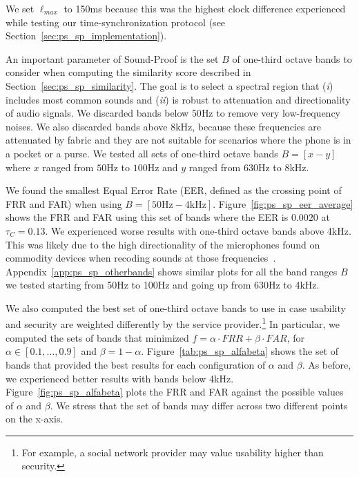 We set $\ell_{max}$ to 150ms because this was the highest clock difference experienced while testing our time-synchronization protocol (see Section~\ref{sec:ps_sp_implementation}).


An important parameter of Sound-Proof is the set $B$ of one-third octave bands to consider when computing the similarity score described in Section~\ref{sec:ps_sp_similarity}.
The goal is to select a spectral region that (\emph{i}) includes most common sounds and (\emph{ii}) is robust to attenuation and directionality of audio signals.
We discarded bands below $50\text{Hz}$ to remove very low-frequency noises.
We also discarded bands above $8\text{kHz}$, because these frequencies are attenuated by fabric and they are not suitable for scenarios where the phone is in a pocket or a purse.
We tested all sets of one-third octave bands $B=[x-y]$ where $x$ ranged from $50$Hz to $100$Hz and $y$ ranged from $630$Hz to $8$kHz.


We found the smallest Equal Error Rate (EER, defined as the crossing point of FRR and FAR) when using $B=[50\text{Hz}-4\text{kHz}]$.
Figure~\ref{fig:ps_sp_eer_average} shows the FRR and FAR using this set of bands where the EER is $0.0020$ at $\tau_{C}=0.13$.
We experienced worse results with one-third octave bands above 4kHz.
This was likely due to the high directionality of the microphones found on commodity devices when recoding sounds at those frequencies~\cite{book}. Appendix~\ref{app:ps_sp_otherbands} shows similar plots for all the band ranges $B$ we tested starting from 50Hz to 100Hz and going up from 630Hz to 4kHz.

We also computed the best set of one-third octave bands to use in case usability and security are weighted differently by the service provider.\footnote{For example,
a social network provider may value usability higher than security.}
In particular, we computed the sets of bands that minimized $f=\alpha\cdot FRR+\beta\cdot FAR$, for $\alpha\in[0.1,\ldots,0.9]$ and $\beta=1-\alpha$.
Figure~\ref{tab:ps_sp_alfabeta} shows the set of bands that provided the best results for each configuration of $\alpha$ and $\beta$.
As before, we experienced better results with bands below 4kHz.
Figure~\ref{fig:ps_sp_alfabeta} plots the FRR and FAR against the possible values of $\alpha$ and $\beta$.
We stress that the set of bands may differ across two different points on the x-axis.

